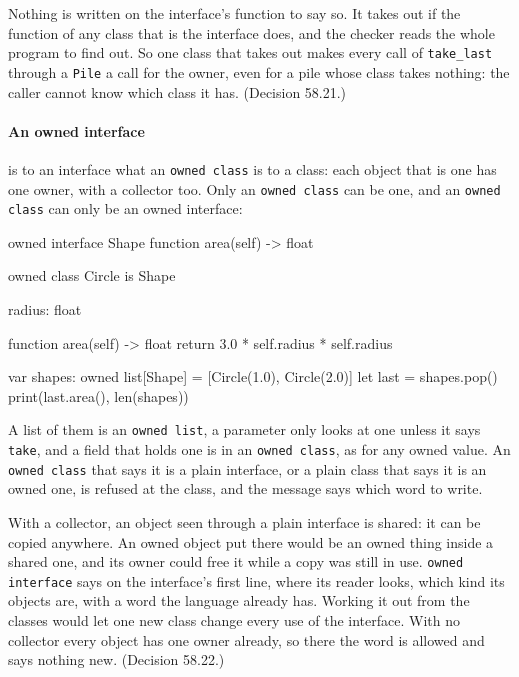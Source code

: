 Nothing is written on the interface's function to say so. It takes out
if the function of any class that is the interface does, and the
checker reads the whole program to find out. So one class that takes
out makes every call of \verb|take_last| through a \verb|Pile| a call
for the owner, even for a pile whose class takes nothing: the caller
cannot know which class it has. (Decision 58.21.)

\paragraph{An owned interface} is to an interface what an
\verb|owned class| is to a class: each object that is one has one
owner, with a collector too. Only an \verb|owned class| can be one,
and an \verb|owned class| can only be an owned interface:

\begin{zeno}[file=shapes.zeno, dir=owned]
owned interface Shape {
    function area(self) -> float
}

owned class Circle is Shape {
    radius: float

    function area(self) -> float {
        return 3.0 * self.radius * self.radius
    }
}

var shapes: owned list[Shape] = [Circle(1.0), Circle(2.0)]
let last = shapes.pop()
print(last.area(), len(shapes))
\end{zeno}

A list of them is an \verb|owned list|, a parameter only looks at one
unless it says \verb|take|, and a field that holds one is in an
\verb|owned class|, as for any owned value. An \verb|owned class| that
says it is a plain interface, or a plain class that says it is an
owned one, is refused at the class, and the message says which word
to write.

\begin{why}
With a collector, an object seen through a plain interface is shared:
it can be copied anywhere. An owned object put there would be an owned
thing inside a shared one, and its owner could free it while a copy
was still in use. \verb|owned interface| says on the interface's first
line, where its reader looks, which kind its objects are, with a word
the language already has. Working it out from the classes would let
one new class change every use of the interface. With no collector
every object has one owner already, so there the word is allowed and
says nothing new. (Decision 58.22.)
\end{why}

